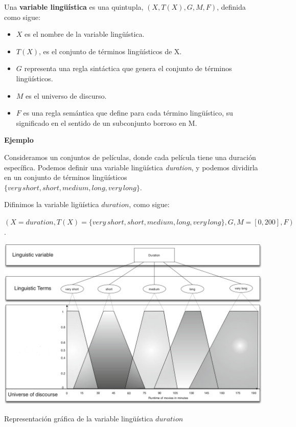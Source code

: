 \documentclass{fancyslides}
\begin{document}
\begin{frame}
\misc
{
Una \textbf{variable lingüística} es una quintupla, $(X, T(X), G, M, F)$, definida como sigue:
\begin{itemize}
  \item $X$ es el nombre de la variable lingüística.
  \item $T(X)$, es el conjunto de términos lingüísticos de X.
  \item \justifying $G$ representa una regla sintáctica que genera el conjunto de términos lingüísticos.
  \item $M$ es el universo de discurso.
  \item \justifying $F$ es una regla semántica que define para cada término lingüístico, su significado en el sentido de un subconjunto borroso en M.
\end{itemize}

}
\end{frame}


\begin{frame}
\misc
{
\textbf{Ejemplo}
\newline

\justifying Consideramos un conjuntos de películas, donde cada película tiene una duración específica.
Podemos definir una variable lingüística \textit{duration}, y podemos dividirla en un conjunto de términos lingüísticos {\footnotesize $\{ very\,short, short, medium, long, very\,long \}$. }

Difinimos la variable ligüística $duration$, como sigue:

{\footnotesize $(X = duration, T(X) = \{ very\,short, short, medium, long, very\,long \}, G, M = [0,200], F)$}.
}
\end{frame}

\begin{frame}
\misc
{
\begin{center}
\includegraphics[scale=0.2]{fuzzy1}

Representación gráfica de la variable lingüística $duration$
\end{center}
}
\end{frame}
\end{document}
